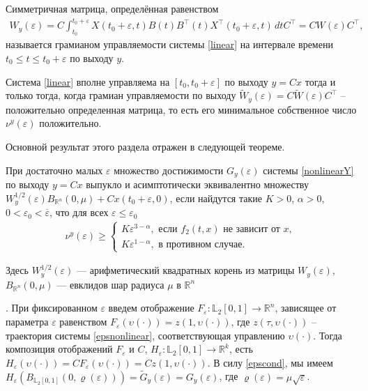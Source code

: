 \documentclass[../main.tex]{subfiles}
\begin{document}
\begin{definition}
	Симметричная матрица, определённая равенством
	\begin{gather*}
		W_y(\varepsilon) = C\int_{t_0}^{t_0+\varepsilon}X(t_0+\varepsilon,t)B(t)B^{\top}(t)X^{\top}(t_0+\varepsilon,t) \, dtC^\top=CW(\varepsilon)C^\top,
	\end{gather*}
	называется грамианом управляемости системы \eqref{linear} на интервале времени $  t_0 \leq t \leq t_0 + \varepsilon $ по выходу $y$.
\end{definition}
	
	Система \eqref{linear} вполне управляема на  $ [t_0, t_0 + \varepsilon] $ по выходу $y=Cx$ тогда и только тогда,
	когда  грамиан управляемости по выходу $ \widetilde{W}_y(\varepsilon) = C \widetilde{W}(\varepsilon) C^{\top}  $ -- положительно определенная матрица, то есть его минимальное собственное число $ \nu^y(\varepsilon) $ положительно.
	
	Основной результат этого раздела отражен в следующей теореме.
	\begin{theorem}\label{th2}
		При достаточно малых $ \varepsilon $ множество достижимости $ G_y(\varepsilon) $ системы \eqref{nonlinearY} по выходу $ y = C x $ выпукло и асимптотически эквивалентно множеству $W_y^{1/2}(\varepsilon)B_{\mathbb{R}^n}(0,\mu) + Cx(t_0+\varepsilon,0)$, если найдутся такие $ K>0 $, $ \alpha > 0 $, $ 0< \varepsilon_0<\overline{\varepsilon}  $, что для всех $ \varepsilon \leqslant \varepsilon_0 $
		\begin{gather}\label{cond1}
			\nu^y(\varepsilon) \geqslant \left\{ {\begin{array}{*{20}{l}}
					{K\varepsilon ^{3 - \alpha}, \mbox{\ если \ } f_2(t,x) \mbox{\ не зависит от \ } x}, \\
					{K\varepsilon ^{1 - \alpha}}, \mbox{\ в противном случае}.
			\end{array}} \right.
		\end{gather}
	\end{theorem}
	
	Здесь $W_y^{1/2}(\varepsilon)$ --- арифметический квадратных корень из матрицы $W_y(\varepsilon)$, $ B_{\mathbb{R}^n}(0,\mu) $ --- евклидов шар радиуса $ \mu $ в $ \mathbb{R}^n $
	
	\doc. 
	При фиксированном $ \varepsilon $ введем отображение $ F_{\varepsilon}: \mathbb{L}_2[0,1]  \rightarrow \mathbb{R}^n$, зависящее от параметра $ \varepsilon $ равенством $F_{\varepsilon}(\upsilon(\cdot)) = z(1,\upsilon(\cdot)) $, где  $ z(\tau,\upsilon(\cdot)) $ -- траектория системы \eqref{epsnonlinear}, соответствующая управлению $ \upsilon(\cdot) $. Тогда композиция отображений $ F_{\varepsilon}$ и $ C $, $ H_{\varepsilon}: \mathbb{L}_2[0,1]  \rightarrow \mathbb{R}^k $, есть $ H_{\varepsilon}(\upsilon(\cdot)) = CF_{\varepsilon}(\upsilon(\cdot)) = Cz(1,\upsilon(\cdot)) $. В силу \eqref{epscond}, мы имеем $ H_{\varepsilon}(B_{\mathbb{L}_2[0,1]}(0,\varrho(\varepsilon))) = \widetilde{G}_y(\varepsilon) = G_y(\varepsilon)  $, где $ \varrho(\varepsilon) = \mu \sqrt{\varepsilon} $.
	
\end{document}
